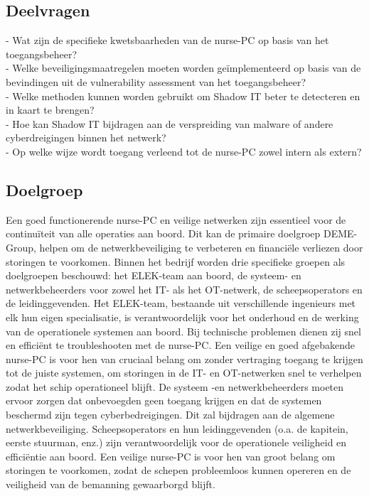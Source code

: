 \subsection{Deelvragen}   
- Wat zijn de specifieke kwetsbaarheden van de nurse-PC op basis van het toegangsbeheer? \\       
- Welke beveiligingsmaatregelen moeten worden geïmplementeerd op basis van de bevindingen uit de vulnerability assessment van het toegangsbeheer? \\
- Welke methoden kunnen worden gebruikt om Shadow IT beter te detecteren en in kaart te brengen? \\
- Hoe kan Shadow IT bijdragen aan de verspreiding van malware of andere cyberdreigingen binnen het netwerk?\\
- Op welke wijze wordt toegang verleend tot de nurse-PC zowel intern als extern? \\

\subsection{Doelgroep}
Een goed functionerende nurse-PC en veilige netwerken zijn essentieel voor de continuïteit van alle operaties aan boord. 
Dit kan de primaire doelgroep DEME-Group, helpen om de netwerkbeveiliging te verbeteren en financiële verliezen door storingen te voorkomen.
Binnen het bedrijf worden drie specifieke groepen als doelgroepen beschouwd: het ELEK-team aan boord, de systeem- en netwerkbeheerders voor zowel het IT- als het OT-netwerk, de scheepsoperators en de leidinggevenden.
Het ELEK-team, bestaande uit verschillende ingenieurs met elk hun eigen specialisatie, is verantwoordelijk voor het onderhoud en de werking van de operationele systemen aan boord. Bij technische problemen dienen zij snel en efficiënt te troubleshooten met de nurse-PC.  
Een veilige en goed afgebakende nurse-PC is voor hen van cruciaal belang om zonder vertraging toegang te krijgen tot de juiste systemen, om storingen in de IT- en OT-netwerken snel te verhelpen zodat het schip operationeel blijft.
De systeem -en netwerkbeheerders moeten ervoor zorgen dat onbevoegden geen toegang krijgen en dat de systemen beschermd zijn tegen cyberbedreigingen. Dit zal bijdragen aan de algemene netwerkbeveiliging.
Scheepsoperators en hun leidinggevenden (o.a. de kapitein, eerste stuurman, enz.) zijn verantwoordelijk voor de operationele veiligheid en efficiëntie aan boord. Een veilige nurse-PC is voor hen van groot belang om storingen te voorkomen, 
zodat de schepen probleemloos kunnen opereren en de veiligheid van de bemanning gewaarborgd blijft.

